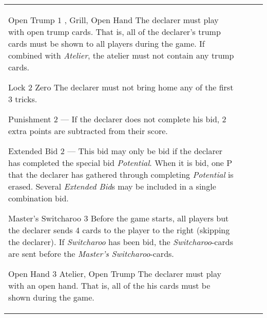 \begin{table}
\begin{center}
\begin{tabularx}{\textwidth}{lcp{3cm}|X}
			\specialBidItem%
			{Open Trump}
			{$1$}
			{\nonTrump, Grill, Open Hand}
			{%
				The declarer must play with open trump cards. That is, all of the declarer’s trump cards must be shown to all players during the game. If combined with \emph{Atelier}, the atelier must not contain any trump cards.
			}

			\specialBidItem%
			{Lock}
			{$2$}
			{Zero}
			{%
				The declarer must not bring home any of the first 3 tricks.
			}

			\specialBidItem%
			{Punishment}
			{$2$}
			{---}
			{%
				If the declarer does not complete his bid, 2 extra points are subtracted from their score.
			}

			\specialBidItem%
			{Extended Bid}
			{$2$}
			{---}
			{%
				This bid may only be bid if the declarer has completed the special bid \emph{Potential}. When it is bid, one P that the declarer has gathered through completing \emph{Potential} is erased. Several \emph{Extended Bid}s may be included in a single combination bid.
			}

			\specialBidItem%
			{Master's Switcharoo}
			{$3$}
			{\nonTrump}
			{%
				Before the game starts, all players but the declarer sends 4 cards to the player to the right (skipping the declarer). If \emph{Switcharoo} has been bid, the \emph{Switcharoo}-cards are sent before the \emph{Master's Switcharoo}-cards.
			}

			\specialBidItem%
			{Open Hand}
			{$3$}
			{Atelier, Open Trump}
			{%
				The declarer must play with an open hand. That is, all of the his cards must be shown during the game.
			}
		\end{tabularx}
	\end{center}
\end{table}
